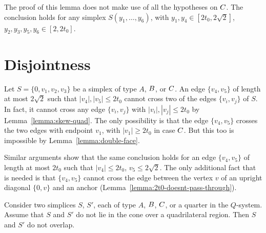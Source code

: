 \begin{remark}  The proof of this lemma does not make use of all the hypotheses
on $C$.  The conclusion holds for any simplex
$S(y_1,\ldots,y_6)$, with $y_1,y_4\in[2t_0,2\sqrt{2}]$,
$y_2,y_3,y_5,y_6\in[2,2t_0]$.
\end{remark}

\section{Disjointness}

Let $S=\{0,v_1,v_2,v_3\}$ be a simplex of type $A$, $B$, or
$C$. An edge $\{v_4,v_5\}$ of length at most $2\sqrt{2}$ such
that $|v_4|,|v_5|\le 2t_0$ cannot cross two of the edges
$\{v_i,v_j\}$ of $S$.  In fact, it cannot cross any edge $\{v_i,v_j\}$
with $|v_i|,|v_j|\le 2t_0$ by Lemma~\ref{lemma:skew-quad}.  The
only possibility is that the edge $\{v_4,v_5\}$ crosses the two
edges with endpoint $v_1$, with $|v_1|\ge2t_0$ in case $C$.  But
this too is impossible by Lemma~\ref{lemma:double-face}.

Similar arguments show that the same conclusion holds for an edge
$\{v_4,v_5\}$ of length at most $2t_0$ such that $|v_4|\le2t_0$,
$v_5\le2\sqrt{2}$.  The only additional fact that is needed is
that $\{v_4,v_5\}$ cannot cross the edge between the vertex $v$ of
an upright diagonal $\{0,v\}$ and an anchor
(Lemma~\ref{lemma:2t0-doesnt-pass-through}).





\begin{lemma}
    \label{lemma:no-overlap}
    Consider two simplices $S$, $S'$, each of  type $A$, $B$, $C$,
or a quarter in the $Q$-system.
    Assume that $S$ and $S'$ do not lie
    in the cone over a quadrilateral region.  Then
    $S$ and $S'$ do not overlap.
\end{lemma}

